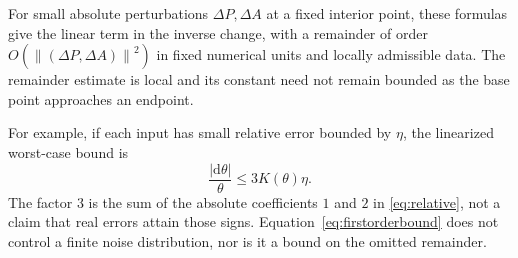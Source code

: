\documentclass[11pt,a4paper]{article}
\theoremstyle{definition}
\newcommand{\dd}{\mathrm d}
\newcommand{\norm}[1]{\left\lVert#1\right\rVert}
\begin{document}
For small absolute perturbations \(\Delta P,\Delta A\) at a fixed interior point, these formulas give the linear term in the inverse change, with a remainder of order \(O(\norm{(\Delta P,\Delta A)}^2)\) in fixed numerical units and locally admissible data. The remainder estimate is local and its constant need not remain bounded as the base point approaches an endpoint.

For example, if each input has small relative error bounded by \(\eta\), the linearized worst-case bound is
\begin{equation}\label{eq:firstorderbound}
 \frac{|\dd\theta|}{\theta}\le 3K(\theta)\eta .
\end{equation}
The factor \(3\) is the sum of the absolute coefficients \(1\) and \(2\) in \eqref{eq:relative}, not a claim that real errors attain those signs. Equation~\eqref{eq:firstorderbound} does not control a finite noise distribution, nor is it a bound on the omitted remainder.
\end{document}
